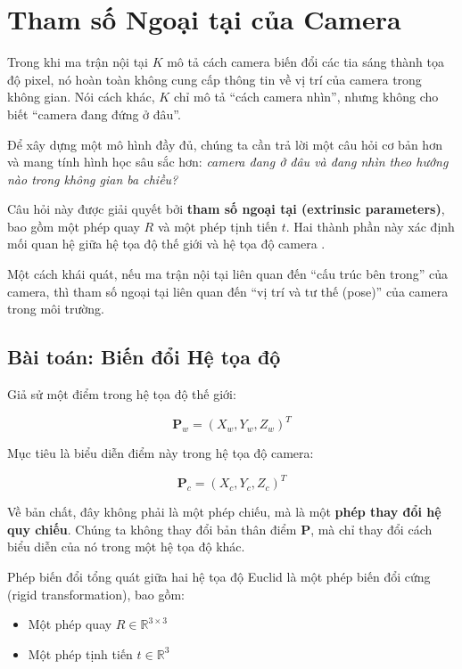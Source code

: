 \section{Tham số Ngoại tại của Camera}
\label{sec:extrinsic_parameters}

Trong khi ma trận nội tại $K$ mô tả cách camera biến đổi các tia sáng thành tọa độ pixel, nó hoàn toàn không cung cấp thông tin về vị trí của camera trong không gian. Nói cách khác, $K$ chỉ mô tả “cách camera nhìn”, nhưng không cho biết “camera đang đứng ở đâu”.

Để xây dựng một mô hình đầy đủ, chúng ta cần trả lời một câu hỏi cơ bản hơn và mang tính hình học sâu sắc hơn: \textit{camera đang ở đâu và đang nhìn theo hướng nào trong không gian ba chiều?}

Câu hỏi này được giải quyết bởi \textbf{tham số ngoại tại (extrinsic parameters)}, bao gồm một phép quay $R$ và một phép tịnh tiến $t$. Hai thành phần này xác định mối quan hệ giữa hệ tọa độ thế giới và hệ tọa độ camera \cite{Hartley2003, Szeliski2010}.

Một cách khái quát, nếu ma trận nội tại liên quan đến “cấu trúc bên trong” của camera, thì tham số ngoại tại liên quan đến “vị trí và tư thế (pose)” của camera trong môi trường.

\subsection{Bài toán: Biến đổi Hệ tọa độ}
\label{subsec:extrinsic_problem}

Giả sử một điểm trong hệ tọa độ thế giới:

\[
\mathbf{P}_w = (X_w, Y_w, Z_w)^T
\]

Mục tiêu là biểu diễn điểm này trong hệ tọa độ camera:

\[
\mathbf{P}_c = (X_c, Y_c, Z_c)^T
\]

Về bản chất, đây không phải là một phép chiếu, mà là một \textbf{phép thay đổi hệ quy chiếu}. Chúng ta không thay đổi bản thân điểm $\mathbf{P}$, mà chỉ thay đổi cách biểu diễn của nó trong một hệ tọa độ khác.

Phép biến đổi tổng quát giữa hai hệ tọa độ Euclid là một phép biến đổi cứng (rigid transformation), bao gồm:
\begin{itemize}
	\item Một phép quay $R \in \mathbb{R}^{3 \times 3}$
	\item Một phép tịnh tiến $t \in \mathbb{R}^{3}$
\end{itemize}


